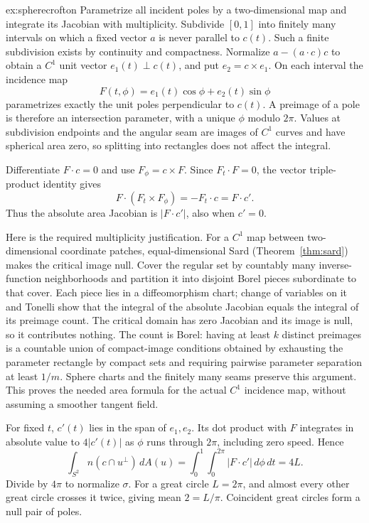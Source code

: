\begin{solution}{ex:spherecrofton}
\idea Parametrize all incident poles by a two-dimensional map and integrate its Jacobian with multiplicity.
\writeup Subdivide $[0,1]$ into finitely many intervals on which a fixed vector $a$ is never parallel to $c(t)$. Such a finite subdivision exists by continuity and compactness. Normalize $a-(a\cdot c)c$ to obtain a $C^1$ unit vector $e_1(t)\perp c(t)$, and put $e_2=c\times e_1$. On each interval the incidence map
\[
F(t,\phi)=e_1(t)\cos\phi+e_2(t)\sin\phi
\]
parametrizes exactly the unit poles perpendicular to $c(t)$. A preimage of a pole is therefore an intersection parameter, with a unique $\phi$ modulo $2\pi$. Values at subdivision endpoints and the angular seam are images of $C^1$ curves and have spherical area zero, so splitting into rectangles does not affect the integral.

Differentiate $F\cdot c=0$ and use $F_\phi=c\times F$. Since $F_t\cdot F=0$, the vector triple-product identity gives
\[
F\cdot(F_t\times F_\phi)=-F_t\cdot c=F\cdot c'.
\]
Thus the absolute area Jacobian is $|F\cdot c'|$, also when $c'=0$.

Here is the required multiplicity justification. For a $C^1$ map between two-dimensional coordinate patches, equal-dimensional Sard (Theorem~\ref{thm:sard}) makes the critical image null. Cover the regular set by countably many inverse-function neighborhoods and partition it into disjoint Borel pieces subordinate to that cover. Each piece lies in a diffeomorphism chart; change of variables on it and Tonelli show that the integral of the absolute Jacobian equals the integral of its preimage count. The critical domain has zero Jacobian and its image is null, so it contributes nothing. The count is Borel: having at least $k$ distinct preimages is a countable union of compact-image conditions obtained by exhausting the parameter rectangle by compact sets and requiring pairwise parameter separation at least $1/m$. Sphere charts and the finitely many seams preserve this argument. This proves the needed area formula for the actual $C^1$ incidence map, without assuming a smoother tangent field.

For fixed $t$, $c'(t)$ lies in the span of $e_1,e_2$. Its dot product with $F$ integrates in absolute value to $4|c'(t)|$ as $\phi$ runs through $2\pi$, including zero speed. Hence
\[
\int_{S^2}n(c\cap u^\perp)\,dA(u)
=\int_0^1\int_0^{2\pi}|F\cdot c'|\,d\phi\,dt=4L.
\]
Divide by $4\pi$ to normalize $\sigma$. For a great circle $L=2\pi$, and almost every other great circle crosses it twice, giving mean $2=L/\pi$. Coincident great circles form a null pair of poles.
\end{solution}

